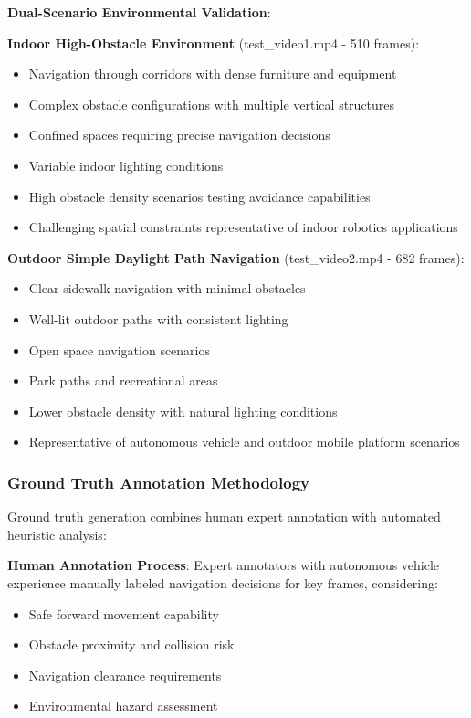 \documentclass[12pt,oneside]{book}
\begin{document}
\textbf{Dual-Scenario Environmental Validation}:

\textbf{Indoor High-Obstacle Environment} (test\_video1.mp4 - 510 frames):
\begin{itemize}
\item Navigation through corridors with dense furniture and equipment
\item Complex obstacle configurations with multiple vertical structures
\item Confined spaces requiring precise navigation decisions
\item Variable indoor lighting conditions
\item High obstacle density scenarios testing avoidance capabilities
\item Challenging spatial constraints representative of indoor robotics applications
\end{itemize}

\textbf{Outdoor Simple Daylight Path Navigation} (test\_video2.mp4 - 682 frames):
\begin{itemize}
\item Clear sidewalk navigation with minimal obstacles
\item Well-lit outdoor paths with consistent lighting
\item Open space navigation scenarios
\item Park paths and recreational areas
\item Lower obstacle density with natural lighting conditions
\item Representative of autonomous vehicle and outdoor mobile platform scenarios
\end{itemize}

\subsubsection{Ground Truth Annotation Methodology}

Ground truth generation combines human expert annotation with automated heuristic analysis:

\textbf{Human Annotation Process}:
Expert annotators with autonomous vehicle experience manually labeled navigation decisions for key frames, considering:
\begin{itemize}
\item Safe forward movement capability
\item Obstacle proximity and collision risk
\item Navigation clearance requirements
\item Environmental hazard assessment
\end{itemize}
\end{document}
